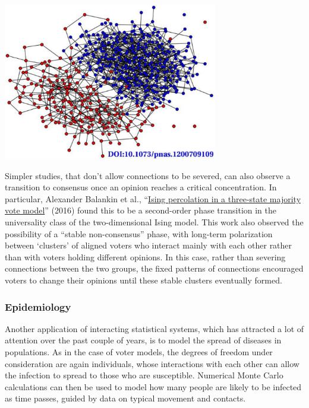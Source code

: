 \begin{center}\includegraphics[width=0.7\textwidth]{figs/unit10_voter.pdf}\end{center}

Simpler studies, that don't allow connections to be severed, can also observe a transition to consensus once an opinion reaches a critical concentration.
In particular, Alexander Balankin et al., ``\href{https://doi.org/10.1016/j.physleta.2016.12.001}{Ising percolation in a three-state majority vote model}'' (2016) found this to be a second-order phase transition in the universality class of the two-dimensional Ising model.
This work also observed the possibility of a ``stable non-consensus'' phase, with long-term polarization between `clusters' of aligned voters who interact mainly with each other rather than with voters holding different opinions.
In this case, rather than severing connections between the two groups, the fixed patterns of connections encouraged voters to change their opinions until these stable clusters eventually formed.

\subsubsection*{Epidemiology}
Another application of interacting statistical systems, which has attracted a lot of attention over the past couple of years, is to model the spread of diseases in populations.
As in the case of voter models, the degrees of freedom under consideration are again individuals, whose interactions with each other can allow the infection to spread to those who are susceptible.
Numerical Monte Carlo calculations can then be used to model how many people are likely to be infected as time passes, guided by data on typical movement and contacts.

